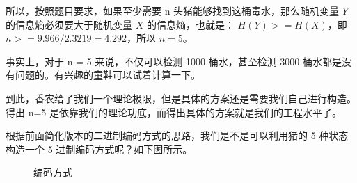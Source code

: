 \documentclass[12pt]{article}
\begin{document}
所以，按照题目要求，如果至少需要 n 头猪能够找到这桶毒水，那么随机变量 $Y$ 的信息熵必须要大于随机变量 $X$ 的信息熵，也就是：
$H(Y)>=H(X)$，即$n>=9.966/2.3219=4.292$，所以 $n=5$。

事实上，对于 n = 5 来说，不仅可以检测 1000 桶水，甚至检测 3000 桶水都是没有问题的。有兴趣的童鞋可以试着计算一下。

到此，香农给了我们一个理论极限，但是具体的方案还是需要我们自己进行构造。得出 n=5 是依靠我们的理论功底，而得出具体的方案就是我们的工程水平了。

根据前面简化版本的二进制编码方式的思路，我们是不是可以利用猪的 5 种状态构造一个 5 进制编码方式呢？如下图所示。

\begin{figure}[ht]
	\centering  %
    
	\caption{编码方式}
	\label{level}
\end{figure}
\end{document}
